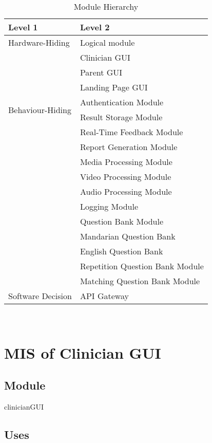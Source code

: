 \documentclass[12pt, titlepage]{article}
\begin{document}
\begin{table}[h!]
  \centering
  \begin{tabular}{p{} p{}}
  \toprule
  \textbf{Level 1} & \textbf{Level 2}\\
  \midrule
  
  {Hardware-Hiding} & Logical module \\
  \midrule
  
  \multirow{8}{0.3\textwidth}{Behaviour-Hiding} & Clinician GUI\\
  & Parent GUI\\
  & Landing Page GUI\\
  & Authentication Module\\
  & Result Storage Module\\
  & Real-Time Feedback Module\\ 
  & Report Generation Module\\
  & Media Processing Module\\
  & Video Processing Module\\
  & Audio Processing Module\\
  & Logging Module\\
  & Question Bank Module\\
  & Mandarian Question Bank\\
  & English Question Bank\\
  & Repetition Question Bank Module\\
  & Matching Question Bank Module\\
  \midrule
  
  \multirow{1}{0.3\textwidth}{Software Decision} & API Gateway\\
  \bottomrule
  
  \end{tabular}
  \caption{Module Hierarchy}
  \label{TblMH}
  \end{table}
~\newpage
\section{MIS of Clinician GUI \label{mClinicianGUI} }

\subsection{Module}

clinicianGUI

\subsection{Uses}
\end{document}
